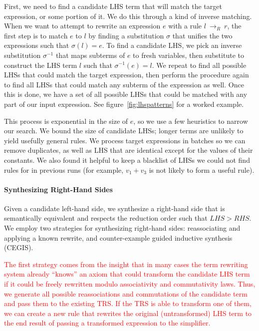 \documentclass[acmsmall,review]{acmart}\settopmatter{printfolios=true,printccs=false,printacmref=false}
\newcommand{\modified}[1]{\textcolor{red}{{#1}}}
\newcommand{\rewrites}[0]{\:\rightarrow_{R}\:}
\begin{document}
First, we need to find a candidate LHS term that will match the target expression, 
or some portion of it. We do this through a kind of inverse matching. When we want 
to attempt to rewrite an expression $e$ with a rule $l \rewrites r$, the first step is to 
match $e$ to $l$ by finding a substitution $\sigma$ that unifies the two expressions 
such that $\sigma(l) = e$. To find a candidate LHS, we pick an inverse substitution $\sigma^{-1}$
that maps subterms of $e$ to fresh variables, then substitute to construct the LHS term $l$
such that $\sigma^{-1}(e) = l$. We repeat to find all possible LHSs that could match the
target expression, then perform the procedure again to find all LHSs that could match 
any subterm of the expression as well. Once this is done, we have a set of all possible
LHSs that could be matched with any part of our input expression. See figure~\ref{fig:lhspatterns} 
for a worked example.

This process is exponential in the size of $e$, so we use a few heuristics to narrow 
our search. We bound the size of candidate LHSs; longer terms are unlikely to 
yield usefully general rules. We process target expressions in batches so we can remove 
duplicates, as well as LHS that are identical except for the values of their constants. 
We also found it helpful to keep a blacklist of LHSs we could not find rules for in 
previous runs (for example, $v_1 + v_3$ is not likely to form a useful rule).

\paragraph{Synthesizing Right-Hand Sides} Given a candidate left-hand side, we 
synthesize a right-hand side that is semantically equivalent and
respects the reduction order such that $\mathit{LHS} > \mathit{RHS}$.
We employ two strategies for synthesizing right-hand sides:
reassociating and applying a known rewrite, and counter-example guided
inductive synthesis (CEGIS).

\modified{The first strategy comes from the insight that in many cases the term rewriting system 
already ``knows'' an axiom that could transform the candidate LHS term if it could be freely 
rewritten modulo associativity and commutativity laws. Thus, we generate all possible 
reassociations and commutations of the candidate term and pass them to the existing TRS. 
If the TRS is able to transform one of them, we can create a new rule that rewrites 
the original (untransformed) LHS term to the end result of passing a transformed expression to the simplifier.}
\end{document}

